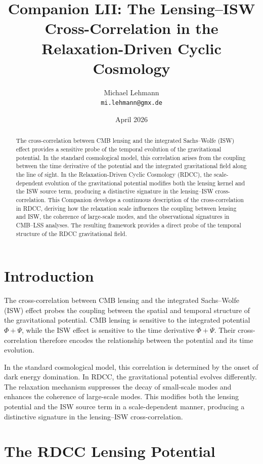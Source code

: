 \documentclass[11pt,a4paper]{article}
\title{\textbf{Companion LII: The Lensing--ISW Cross-Correlation in the Relaxation-Driven Cyclic Cosmology}}
\author{Michael Lehmann \\ \texttt{mi.lehmann@gmx.de}}
\date{April 2026}
\begin{document}
\maketitle

\begin{abstract}
The cross-correlation between CMB lensing and the integrated Sachs--Wolfe (ISW) 
effect provides a sensitive probe of the temporal evolution of the gravitational 
potential. In the standard cosmological model, this correlation arises from the 
coupling between the time derivative of the potential and the integrated 
gravitational field along the line of sight. In the Relaxation-Driven Cyclic 
Cosmology (RDCC), the scale-dependent evolution of the gravitational potential 
modifies both the lensing kernel and the ISW source term, producing a distinctive 
signature in the lensing--ISW cross-correlation. This Companion develops a 
continuous description of the cross-correlation in RDCC, deriving how the 
relaxation scale influences the coupling between lensing and ISW, the coherence of 
large-scale modes, and the observational signatures in CMB--LSS analyses. The 
resulting framework provides a direct probe of the temporal structure of the RDCC 
gravitational field.
\end{abstract}
\section{Introduction}

The cross-correlation between CMB lensing and the integrated Sachs--Wolfe (ISW) 
effect probes the coupling between the spatial and temporal structure of the 
gravitational potential. CMB lensing is sensitive to the integrated potential 
$\Phi + \Psi$, while the ISW effect is sensitive to the time derivative 
$\dot{\Phi} + \dot{\Psi}$. Their cross-correlation therefore encodes the 
relationship between the potential and its time evolution.

In the standard cosmological model, this correlation is determined by the onset of 
dark energy domination. In RDCC, the gravitational potential evolves differently. 
The relaxation mechanism suppresses the decay of small-scale modes and enhances the 
coherence of large-scale modes. This modifies both the lensing potential and the 
ISW source term in a scale-dependent manner, producing a distinctive signature in 
the lensing--ISW cross-correlation.
\section{The RDCC Lensing Potential}
\end{document}
